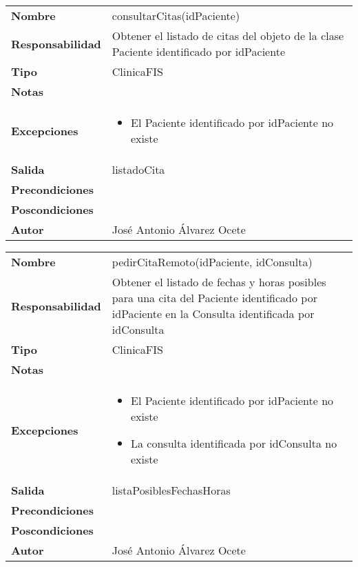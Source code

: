 \documentclass[11pt,a4paper]{article}
\newenvironment{itemizenomargins}
    {\begin{minipage}[t]{1\linewidth}\begin{itemize}}
    {\end{itemize}\end{minipage}}
\begin{document}
\begin{table}[H]
	\centering
	\label{my-label}
	\begin{tabularx}{\textwidth}{l|X}
		\textbf{Nombre}          & consultarCitas(idPaciente) \\
		\textbf{Responsabilidad} & Obtener el listado de citas del objeto de la clase Paciente identificado por idPaciente \\
		\textbf{Tipo}            & ClinicaFIS \\
		\textbf{Notas}           &  \\
		\textbf{Excepciones}     & 
		\begin{itemizenomargins}
			\item El Paciente identificado por idPaciente no existe
		\end{itemizenomargins}\\
		\textbf{Salida}          &  listadoCita\\
		\textbf{Precondiciones}  &  \\
		\textbf{Poscondiciones}  & \\
		\textbf{Autor}           & José Antonio Álvarez Ocete
	\end{tabularx}
\end{table}

\begin{table}[H]
	\centering
	\label{my-label}
	\begin{tabularx}{\textwidth}{l|X}
		\textbf{Nombre}          & pedirCitaRemoto(idPaciente, idConsulta) \\
		\textbf{Responsabilidad} & Obtener el listado de fechas y horas posibles para una cita del Paciente identificado por idPaciente en la Consulta identificada por idConsulta \\
		\textbf{Tipo}            & ClinicaFIS \\
		\textbf{Notas}           &  \\
		\textbf{Excepciones}     & 
		\begin{itemizenomargins}
			\item El Paciente identificado por idPaciente no existe
			\item La consulta identificada por idConsulta no existe
		\end{itemizenomargins}\\
		\textbf{Salida}          &  listaPosiblesFechasHoras\\
		\textbf{Precondiciones}  & \\
		\textbf{Poscondiciones}  & \\
		\textbf{Autor}           & José Antonio Álvarez Ocete
	\end{tabularx}
\end{table}
\end{document}
